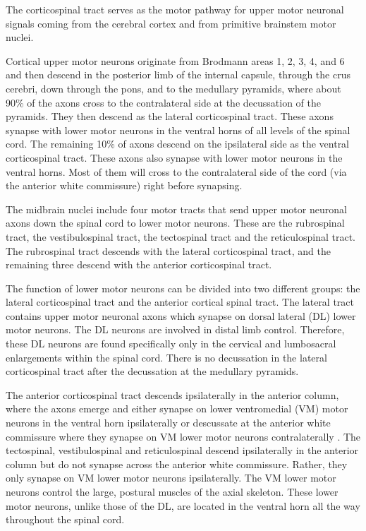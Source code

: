\documentclass[]{book}
\begin{document}
The corticospinal tract serves as the motor pathway for upper motor neuronal signals coming from the cerebral cortex and from primitive brainstem motor nuclei.

Cortical upper motor neurons originate from Brodmann areas 1, 2, 3, 4, and 6 and then descend in the posterior limb of the internal capsule, through the crus cerebri, down through the pons, and to the medullary pyramids, where about 90\% of the axons cross to the contralateral side at the decussation of the pyramids. They then descend as the lateral corticospinal tract. These axons synapse with lower motor neurons in the ventral horns of all levels of the spinal cord. The remaining 10\% of axons descend on the ipsilateral side as the ventral corticospinal tract. These axons also synapse with lower motor neurons in the ventral horns. Most of them will cross to the contralateral side of the cord (via the anterior white commissure) right before synapsing.

The midbrain nuclei include four motor tracts that send upper motor neuronal axons down the spinal cord to lower motor neurons. These are the rubrospinal tract, the vestibulospinal tract, the tectospinal tract and the reticulospinal tract. The rubrospinal tract descends with the lateral corticospinal tract, and the remaining three descend with the anterior corticospinal tract.

The function of lower motor neurons can be divided into two different groups: the lateral corticospinal tract and the anterior cortical spinal tract. The lateral tract contains upper motor neuronal axons which synapse on dorsal lateral (DL) lower motor neurons. The DL neurons are involved in distal limb control. Therefore, these DL neurons are found specifically only in the cervical and lumbosacral enlargements within the spinal cord. There is no decussation in the lateral corticospinal tract after the decussation at the medullary pyramids.

The anterior corticospinal tract descends ipsilaterally in the anterior column, where the axons emerge and either synapse on lower ventromedial (VM) motor neurons in the ventral horn ipsilaterally or descussate at the anterior white commissure where they synapse on VM lower motor neurons contralaterally . The tectospinal, vestibulospinal and reticulospinal descend ipsilaterally in the anterior column but do not synapse across the anterior white commissure. Rather, they only synapse on VM lower motor neurons ipsilaterally. The VM lower motor neurons control the large, postural muscles of the axial skeleton. These lower motor neurons, unlike those of the DL, are located in the ventral horn all the way throughout the spinal cord.
\end{document}
